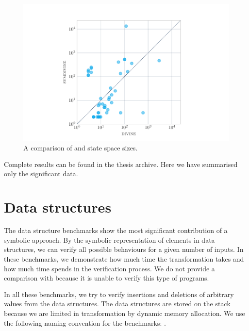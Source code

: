 \begin{figure}
\includegraphics[width=\textwidth]{img/scatter.pdf}
    \caption{A comparison of \DIVINE and \SymDIVINE state space sizes.}
    \label{fig:ss}
\end{figure}

Complete results can be found in the thesis archive. Here we have summarised
only the significant data.

\section{Data structures}

The data structure benchmarks show the most significant contribution of a symbolic
approach. By the symbolic representation of elements in data structures, we can
verify all possible behaviours for a given number of inputs. In these
benchmarks, we demonstrate how much time the transformation takes and how
much time \DIVINE spends in the verification process. We do not provide a
comparison with \SymDIVINE because it is unable to verify this type of
programs.

In all these benchmarks, we try to verify insertions and deletions of arbitrary
values from the data structures. The data structures are stored on the
stack because we are limited in transformation by dynamic memory allocation.
We use the following naming convention for the benchmarks: .

